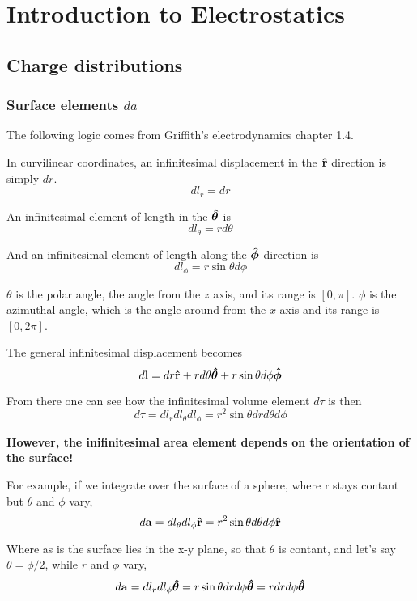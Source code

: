 \chapter{Introduction to Electrostatics}


\section{Charge distributions}


\subsection{Surface elements $da$}

The following logic comes from Griffith's electrodynamics chapter 1.4.

In curvilinear coordinates, an infinitesimal displacement in the $\boldsymbol{\mathbf{\hat{r}}}$ direction is
simply $dr$.
$$
dl_r = dr
$$

An infinitesimal element of length in the $\boldsymbol{\mathbf{\hat{\theta}}}$ is
$$
dl_\theta = r d\theta
$$

And an infinitesimal element of length along the $\boldsymbol{\mathbf{\hat{\phi}}}$ direction
is
$$
dl_\phi = r \sin\theta d\phi
$$

$\theta$ is the polar angle, the angle from the $z$ axis, and its range is $[0, \pi]$.
$\phi$ is the azimuthal angle, which is the angle around from the $x$ axis and its range is $[0, 2\pi]$.

The general infinitesimal displacement becomes
$$
d\boldsymbol{\mathbf{l}} =
dr \boldsymbol{\mathbf{\hat{r}}}
+ r d\theta \boldsymbol{\mathbf{\hat{\theta}}}
+ r \sin\theta d\phi \boldsymbol{\mathbf{\hat{\phi}}}
$$

From there one can see how the infinitesimal volume element $d\tau$ is then
$$
d\tau = dl_r dl_\theta dl_\phi =
r^2 \sin\theta dr d\theta d\phi
$$

\textbf{However, the inifinitesimal area element depends on the orientation of the surface!}

For example, if we integrate over the surface of a sphere, where r stays contant but $\theta$
and $\phi$ vary,
$$
d\boldsymbol{\mathbf{a}} = dl_\theta dl_\phi \boldsymbol{\mathbf{\hat{r}}} = r^2 \sin\theta d\theta d\phi \boldsymbol{\mathbf{\hat{r}}}
$$

Where as is the surface lies in the x-y plane, so that $\theta$ is contant, and let's say $\theta = \phi/2$,
while $r$ and $\phi$ vary,
$$
d\boldsymbol{\mathbf{a}} = dl_r dl_\phi \boldsymbol{\mathbf{\hat{\theta}}}
= r \sin\theta dr d\phi \boldsymbol{\mathbf{\hat{\theta}}}
= r dr d\phi \boldsymbol{\mathbf{\hat{\theta}}}
$$

